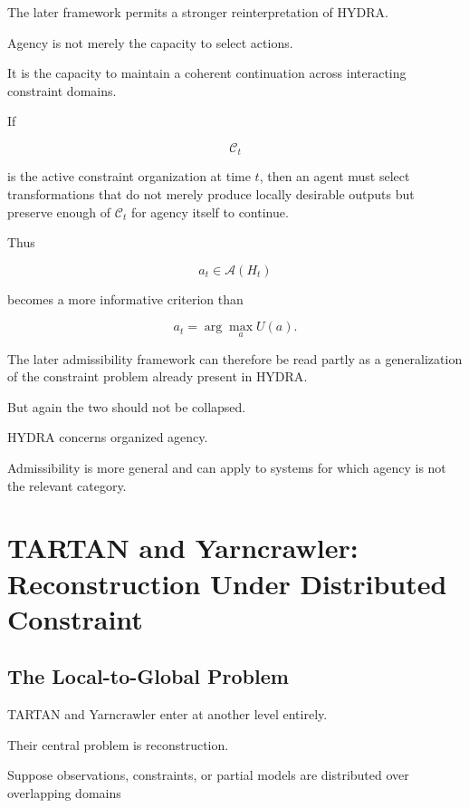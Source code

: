 \documentclass[11pt]{article}
\theoremstyle{remark}
\newcommand{\HYDRA}{\textsc{HYDRA}}
\newcommand{\TARTAN}{\textsc{TARTAN}}
\newcommand{\Adm}{\mathcal{A}}
\begin{document}
The later framework permits a stronger reinterpretation of \HYDRA{}.

Agency is not merely the capacity to select actions.

It is the capacity to maintain a coherent continuation across interacting constraint domains.

If

\begin{equation}
\mathcal{C}_t
\end{equation}

is the active constraint organization at time $t$, then an agent must select transformations that do not merely produce locally desirable outputs but preserve enough of $\mathcal{C}_t$ for agency itself to continue.

Thus

\begin{equation}
a_t
\in
\Adm(H_t)
\end{equation}

becomes a more informative criterion than

\begin{equation}
a_t
=
\arg\max_a U(a).
\end{equation}

The later admissibility framework can therefore be read partly as a generalization of the constraint problem already present in \HYDRA{}.

But again the two should not be collapsed.

\HYDRA{} concerns organized agency.

Admissibility is more general and can apply to systems for which agency is not the relevant category.

\section{\TARTAN{} and Yarncrawler: Reconstruction Under Distributed Constraint}

\subsection{The Local-to-Global Problem}

\TARTAN{} and Yarncrawler enter at another level entirely.

Their central problem is reconstruction.

Suppose observations, constraints, or partial models are distributed over overlapping domains
\end{document}
